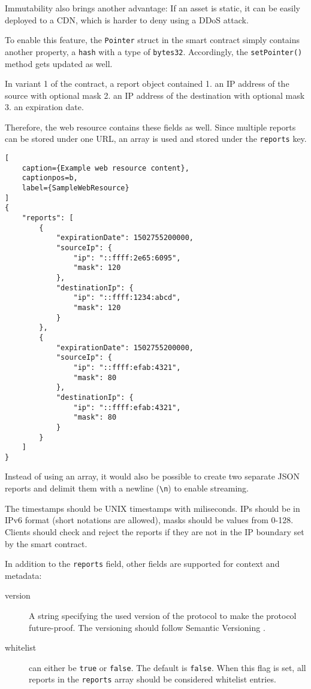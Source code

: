Immutability also brings another advantage: If an asset is static, it can be easily deployed to a CDN, which is harder to deny using a DDoS attack.

To enable this feature, the \texttt{Pointer} struct in the smart contract simply contains another property, a \texttt{hash} with a type of \texttt{bytes32}. Accordingly, the \texttt{setPointer()} method gets updated as well.

In variant 1 of the contract, a report object contained 1. an IP address of the source with optional mask 2. an IP address of the destination with optional mask 3. an expiration date.

Therefore, the web resource contains these fields as well. Since multiple reports can be stored under one URL, an array is used and stored under the \texttt{reports} key.

\begin{lstlisting}[
    caption={Example web resource content},
    captionpos=b,
    label={SampleWebResource}
]
{
    "reports": [
        {
            "expirationDate": 1502755200000,
            "sourceIp": {
                "ip": "::ffff:2e65:6095",
                "mask": 120
            },
            "destinationIp": {
                "ip": "::ffff:1234:abcd",
                "mask": 120
            }
        },
        {
            "expirationDate": 1502755200000,
            "sourceIp": {
                "ip": "::ffff:efab:4321",
                "mask": 80
            },
            "destinationIp": {
                "ip": "::ffff:efab:4321",
                "mask": 80
            }
        }
    ]
}
\end{lstlisting}

Instead of using an array, it would also be possible to create two separate JSON reports and delimit them with a newline (\texttt{{\textbackslash}n}) to enable streaming.

The timestamps should be UNIX timestamps with miliseconds. IPs should be in IPv6 format (short notations are allowed), masks should be values from 0-128. Clients should check and reject the reports if they are not in the IP boundary set by the smart contract.

In addition to the \texttt{reports} field, other fields are supported for context and metadata:

\begin{description}

\item [version] A string specifying the used version of the protocol to make the protocol future-proof. The versioning should follow Semantic Versioning \cite{Semver}.

\item [whitelist] can either be \texttt{true} or \texttt{false}. The default is \texttt{false}. When this flag is set, all reports in the \texttt{reports} array should be considered whitelist entries.

\end{description}

